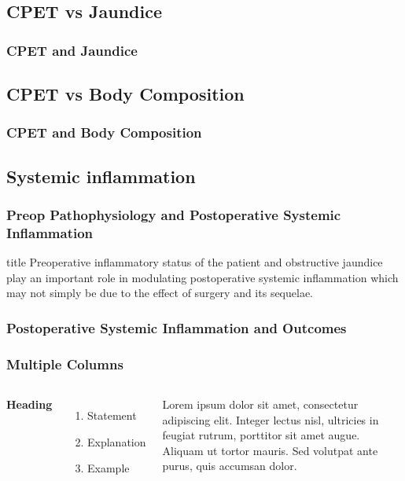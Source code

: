 \documentclass{beamer}
\begin{document}
\subsection{CPET vs Jaundice}
\begin{frame}
	\frametitle{CPET and Jaundice}
\end{frame}

\subsection{CPET vs Body Composition}
\begin{frame}
	\frametitle{CPET and Body Composition}
\end{frame}

\subsection{Systemic inflammation}

\begin{frame}
	\frametitle{Preop Pathophysiology and Postoperative Systemic Inflammation}
	\begin{block}{title}
		Preoperative inflammatory status of the patient and obstructive jaundice play an important role in modulating postoperative systemic inflammation which may not simply be due to the effect of surgery and its sequelae.
	\end{block}
\end{frame}

\begin{frame}
	\frametitle{Postoperative Systemic Inflammation and Outcomes}
\end{frame}




\begin{frame}
\frametitle{Multiple Columns}
\begin{columns}[c] %

\textbf{Heading}
\begin{enumerate}
\item Statement
\item Explanation
\item Example
\end{enumerate}

Lorem ipsum dolor sit amet, consectetur adipiscing elit. Integer lectus nisl, ultricies in feugiat rutrum, porttitor sit amet augue. Aliquam ut tortor mauris. Sed volutpat ante purus, quis accumsan dolor.

\end{columns}
\end{frame}
\end{document}
